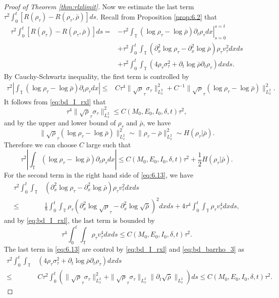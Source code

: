 \documentclass[leqno]{amsart}
\theoremstyle{plain}
\theoremstyle{definition}
\theoremstyle{remark}
\theoremstyle{plain}
\theoremstyle{plain}
\def\T{{\mathbb T}}%
\def\d{{\partial}}
\numberwithin{equation}{section}
\begin{document}
\begin{proof}[Proof of Theorem \ref{thm:rlxlimit}]
Now we estimate the last term $\tau^2\int_0^t[R(\rho_\tau)-R(\rho_\tau,\bar\rho)]ds$. Recall from Proposition \ref{prop:6.2} that 
\begin{equation}\label{eq:6.13}
\begin{aligned}
\tau^2\int_0^t[R(\rho_\tau)-R(\rho_\tau,\bar\rho)]ds=&-\tau^2\left.\int_\T(\log\rho_\tau-\log\bar\rho)\d_t\rho_\tau dx\right|_{s=0}^{s=t}\\
&+\tau^2\int_0^t\int_\T(\d_x^2\log\rho_\tau-\d_x^2\log\bar\rho)\rho_\tau v_\tau^2dxds\\
&+\tau^2\int_0^t\int_\T(4\rho_\tau\sigma^2_\tau+\d_t\log\bar\rho\d_t\rho_\tau) dxds.
\end{aligned}
\end{equation}
By Cauchy-Schwartz inequality, the first term is controlled by
\begin{align*}
\tau^2\left|\int_\T(\log\rho_\tau-\log\bar\rho)\d_t\rho_\tau dx\right|\leq & C\tau^4\|\sqrt\rho_\tau\sigma_\tau\|_{L^2_x}^2+C^{-1}\|\sqrt\rho_\tau(\log\rho_\tau-\log\bar\rho)\|_{L^2_x}^2.
\end{align*}
It follows from \eqref{eq:bd_I_rxl} that
\[
\tau^4\|\sqrt\rho_\tau\sigma_\tau\|_{L^2_x}^2\leq C(M_0,E_0,I_0,\delta,t)\tau^2,
\]
and by the upper and lower bound of $\rho_\tau$ and $\bar\rho$, we have
\[
\|\sqrt\rho_\tau(\log\rho_\tau-\log\bar\rho)\|_{L^2_x}^2\sim\|\rho_\tau-\bar\rho\|_{L^2_x}^2\sim H(\rho_\tau|\bar\rho).
\]
Therefore we can choose $C$ large such that
\[
\tau^2\left|\int_\T(\log\rho_\tau-\log\bar\rho)\d_t\rho_\tau dx\right|\leq C(M_0,E_0,I_0,\delta,t)\tau^2+\frac12 H(\rho_\tau|\bar\rho).
\]
For the second term in the right hand side of \eqref{eq:6.13}, we have
\begin{align*}
\tau^2\int_0^t\int_\T&(\d_x^2\log\rho_\tau-\d_x^2\log\bar\rho)\rho_\tau v_\tau^2dxds\\
\leq&\frac18\int_0^t\int_\T\rho_\tau (\d_x^2\log\sqrt\rho_\tau-\d_x^2\log\sqrt{\bar\rho})^2dxds+4\tau^4\int_0^t\int_\T\rho_\tau v_\tau^4dxds,
\end{align*}
and by \eqref{eq:bd_I_rxl}, the last term is bounded by 
\[
\tau^4\int_0^t\int_\T\rho_\tau v_\tau^4dxds\leq C(M_0,E_0,I_0,\delta,t)\tau^2.
\]
The last term in \eqref{eq:6.13} are control by \eqref{eq:bd_I_rxl} and \eqref{eq:bd_barrho_3} as
\begin{align*}
\tau^2\int_0^t\int_\T&(4\rho_\tau\sigma^2_\tau+\d_t\log\bar\rho\d_t\rho_\tau) dxds\\
\leq & C\tau^2\int_0^t(\|\sqrt\rho_\tau\sigma_\tau\|_{L^2_x}^2+\|\sqrt\rho_\tau\sigma_\tau\|_{L^2_x}\|\d_t\sqrt{\bar\rho}\|_{L^2_x})ds\leq C(M_0,E_0,I_0,\delta,t)\tau^2.
\end{align*}


\end{proof}
\end{document}
